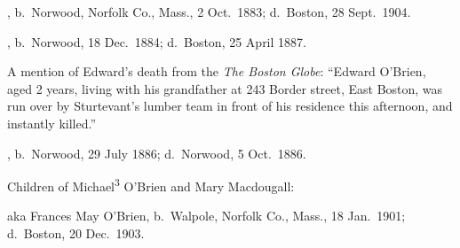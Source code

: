 \begin{Kids}
	
	, b.\ Norwood, Norfolk Co., Mass., 2 Oct.\ 1883;\cite{Arthur4OBrienBirth} d.\ Boston, 28 Sept.\ 1904.\cite{Arthur4OBrienDeath}
	
	, b.\ Norwood, 18 Dec.\ 1884;\cite{Edward4OBrienBirth} d.\ Boston, 25 April 1887.\cite{Edward4OBrienDeath}
	
	\begin{KidsMoreText}
		A mention of Edward's death from the \textit{The Boston Globe}: ``Edward O'Brien, aged 2 years, living with his grandfather at 243 Border street, East Boston, was run over by Sturtevant's lumber team in front of his residence this afternoon, and instantly killed.''\cite{Edward4OBrienDeath2}
	\end{KidsMoreText}
	
	, b.\ Norwood, 29 July 1886;\cite{Elizabeth4OBrienBirth} d.\ Norwood, 5 Oct.\ 1886.\cite{Elizabeth4OBrienDeath}
	
\end{Kids}

\begin{KidsIntro}
	Children of Michael\textsuperscript{3} O'Brien and Mary Macdougall:
\end{KidsIntro}

\begin{Kids}
	 aka Frances May O'Brien, b.\ Walpole, Norfolk Co., Mass., 18 Jan.\ 1901;\cite{Frances4OBrienBirth} d.\ Boston, 20 Dec.\ 1903.\cite{Frances4OBrienDeath}
\end{Kids}